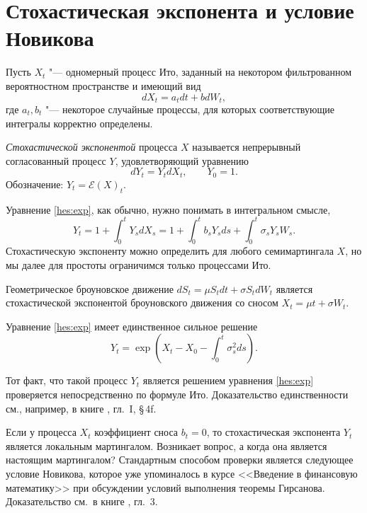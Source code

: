 \chapter{Стохастическая экспонента и условие Новикова}
\label{ch:stoch-exp}


Пусть $X_t$ "--- одномерный процесс Ито, заданный на некотором фильтрованном вероятностном пространстве и имеющий вид
\[
dX_t = a_t dt + b dW_t,
\]
где $a_t,b_t$ "--- некоторое случайные процессы, для которых соответствующие интегралы корректно определены.

\begin{definition}
\emph{Стохастической экспонентой} процесса $X$ называется непрерывный согласованный процесс $Y$, удовлетворяющий уравнению
\begin{equation}
\label{hes:exp}
dY_t = Y_t dX_t,\qquad Y_0=1.
\end{equation}
Обозначение: $Y_t = \mathcal{E}(X)_t$. 
\end{definition}

\begin{remark}
Уравнение \eqref{hes:exp}, как обычно, нужно понимать в интегральном смысле, \te\
\[
Y_t = 1 + \int_0^t Y_s d X_s = 1 + \int_0^t b_sY_s ds + \int_0^t \sigma_s Y_s W_s.
\]
Стохастическую экспоненту можно определить для любого семимартингала $X$, но мы далее для простоты ограничимся только процессами Ито. 
\end{remark}

\begin{example}
Геометрическое броуновское движение $dS_t = \mu S_t dt + \sigma S_t dW_t$ является стохастической экспонентой броуновского движения со сносом $X_t = \mu t + \sigma W_t$. 
\end{example}

\begin{proposition}
Уравнение \eqref{hes:exp} имеет единственное сильное решение
\[
Y_t = \exp\left(X_t - X_0 - \int_0^t \sigma_s^2 ds\right).
\]
\end{proposition}

Тот факт, что такой процесс $Y_t$ является решением уравнения \eqref{hes:exp} проверяется непосредственно по формуле Ито. Доказательство единственности см., например, в книге \cite{JacodShiryaev94}, гл.~I, \S\,4f.

\medskip
Если у процесса $X_t$ коэффициент сноса $b_t=0$, то стохастическая экспонента $Y_t$ является локальным мартингалом.
Возникает вопрос, а когда она является настоящим мартингалом? 
Стандартным способом проверки является следующее условие Новикова, которое уже упоминалось в курсе <<Введение в финансовую математику>> при обсуждении условий выполнения теоремы Гирсанова.
Доказательство см.~в книге \cite{KaratzasShreve91}, гл.~3.

